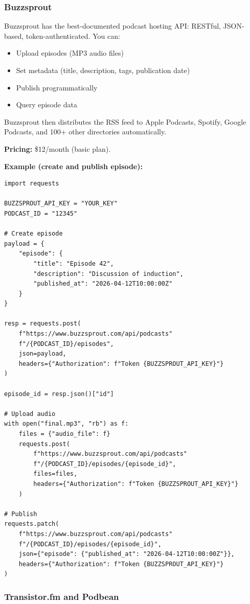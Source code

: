 \documentclass[11pt,letterpaper]{article}
\begin{document}
\subsubsection{Buzzsprout}

Buzzsprout has the best-documented podcast hosting API: RESTful, JSON-based, token-authenticated. You can:

\begin{itemize}
  \item Upload episodes (MP3 audio files)
  \item Set metadata (title, description, tags, publication date)
  \item Publish programmatically
  \item Query episode data
\end{itemize}

Buzzsprout then distributes the RSS feed to Apple Podcasts, Spotify, Google Podcasts, and 100+ other directories automatically.

\textbf{Pricing:} \$12/month (basic plan).

\textbf{Example (create and publish episode):}

\begin{verbatim}
import requests

BUZZSPROUT_API_KEY = "YOUR_KEY"
PODCAST_ID = "12345"

# Create episode
payload = {
    "episode": {
        "title": "Episode 42",
        "description": "Discussion of induction",
        "published_at": "2026-04-12T10:00:00Z"
    }
}

resp = requests.post(
    f"https://www.buzzsprout.com/api/podcasts"
    f"/{PODCAST_ID}/episodes",
    json=payload,
    headers={"Authorization": f"Token {BUZZSPROUT_API_KEY}"}
)

episode_id = resp.json()["id"]

# Upload audio
with open("final.mp3", "rb") as f:
    files = {"audio_file": f}
    requests.post(
        f"https://www.buzzsprout.com/api/podcasts"
        f"/{PODCAST_ID}/episodes/{episode_id}",
        files=files,
        headers={"Authorization": f"Token {BUZZSPROUT_API_KEY}"}
    )

# Publish
requests.patch(
    f"https://www.buzzsprout.com/api/podcasts"
    f"/{PODCAST_ID}/episodes/{episode_id}",
    json={"episode": {"published_at": "2026-04-12T10:00:00Z"}},
    headers={"Authorization": f"Token {BUZZSPROUT_API_KEY}"}
)
\end{verbatim}

\subsubsection{Transistor.fm and Podbean}
\end{document}
